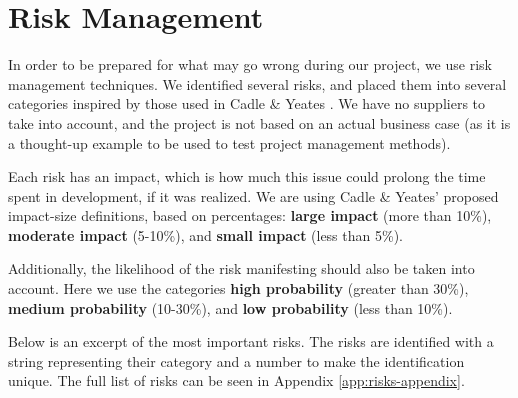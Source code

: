 \section{Risk Management}

In order to be prepared for what may go wrong during our project, we use risk management techniques.
We identified several risks, and placed them into several categories inspired by those used in Cadle
\& Yeates \cite{caye}. We have no suppliers to take into account, and the project is not
based on an actual business case (as it is a thought-up example to be used to test project management
methods).

Each risk has an impact, which is how much this issue could prolong the time spent in development,
if it was realized. We are using Cadle \& Yeates' proposed impact-size definitions, based on percentages:
\textbf{large impact} (more than 10\%), \textbf{moderate impact} (5-10\%), and \textbf{small impact}
(less than 5\%).

Additionally, the likelihood of the risk manifesting should also be taken into account. Here we use the
categories \textbf{high probability} (greater than 30\%), \textbf{medium probability} (10-30\%), and
\textbf{low probability} (less than 10\%).

Below is an excerpt of the most important risks. The risks are
identified with a string representing their category and a number to make the identification unique. The
full list of risks can be seen in Appendix \ref{app:risks-appendix}.

